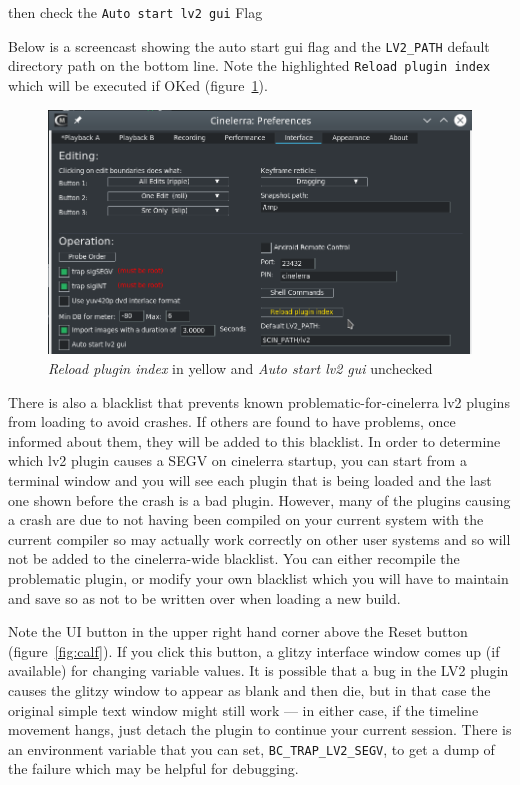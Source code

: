 then check the \texttt{Auto start lv2 gui} Flag

Below is a screencast showing the auto start gui flag and the \texttt{LV2\_PATH} default directory path on the bottom line. Note the highlighted \texttt{Reload plugin index} which will be executed if OKed (figure~\ref{fig:reload}).

\begin{figure}[htpb]
    \centering
    \includegraphics[width=0.8\linewidth]{images/reload.png}
    \caption{\textit{Reload plugin index} in yellow and \textit{Auto start lv2 gui} unchecked}
    \label{fig:reload}
\end{figure}

There is also a blacklist that prevents known problematic-for-cinelerra lv2 plugins from loading to avoid crashes. If others are found to have problems, once informed about them, they will be added to this blacklist. In order to determine which lv2 plugin causes a SEGV on cinelerra startup, you can start from a terminal window and you will see each plugin that is being loaded and the last one shown before the crash is a bad plugin. However, many of the plugins causing a crash are due to not having been compiled on your current system with the current compiler so may actually work correctly on other user systems and so will not be added to the cinelerra-wide blacklist. You can either recompile the problematic plugin, or modify your own blacklist which you will have to maintain and save so as not to be written over when loading a new build.

Note the UI button in the upper right hand corner above the Reset button (figure~\ref{fig:calf}). If you click this button, a glitzy interface window comes up (if available) for changing variable values. It is possible that a bug in the LV2 plugin causes the glitzy window to appear as blank and then die, but in that case the original simple text window might still work --- in either case, if the timeline movement hangs, just detach the plugin to continue your current session. There is an environment variable that you can set,  \texttt{BC\_TRAP\_LV2\_SEGV}, to get a dump of the failure which may be helpful for debugging.

